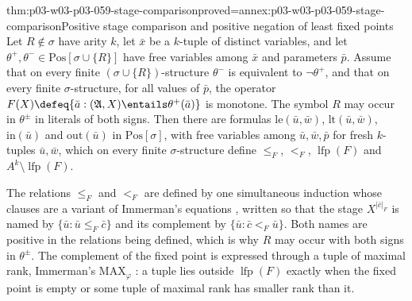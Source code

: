 \begin{hblemma}{thm:p03-w03-p03-059-stage-comparison}{proved=annex:p03-w03-p03-059-stage-comparison}{Positive stage comparison and positive negation of least fixed points}
Let \(R\notin\sigma\) have arity \(k\), let \(\bar x\) be a \(k\)-tuple of
distinct variables, and let
\(\theta^+,\theta^-\in\mathrm{Pos}[\sigma\cup\{R\}]\) have free variables
among \(\bar x\) and parameters \(\bar p\). Assume that on every finite
\((\sigma\cup\{R\})\)-structure \(\theta^-\) is equivalent to
\(\neg\theta^+\), and that on every finite \(\sigma\)-structure, for all
values of \(\bar p\), the operator
\(F(X)\defeq\{\bar a:(\mathfrak A,X)\entails\theta^+(\bar a)\}\) is
monotone. The symbol \(R\) may occur in \(\theta^\pm\) in literals of both
signs. Then there are formulas
\(\mathrm{le}(\bar u,\bar w)\), \(\mathrm{lt}(\bar u,\bar w)\),
\(\mathrm{in}(\bar u)\) and \(\mathrm{out}(\bar u)\) in
\(\mathrm{Pos}[\sigma]\), with free variables among \(\bar u,\bar w,\bar p\)
for fresh \(k\)-tuples \(\bar u,\bar w\), which on every finite
\(\sigma\)-structure define \(\le_F\), \(<_F\),
\(\operatorname{lfp}(F)\) and \(A^k\setminus\operatorname{lfp}(F)\).
\end{hblemma}

The relations \(\le_F\) and \(<_F\) are defined by one simultaneous
induction whose clauses are a variant of Immerman's equations
\cite[p.~98]{Immerman1986}, written so that the stage
\(X^{|\bar c|_F}\) is named by \(\{\bar u:\bar u\le_F\bar c\}\) and its
complement by \(\{\bar u:\bar c<_F\bar u\}\). Both names are positive in
the relations being defined, which is why \(R\) may occur with both signs
in \(\theta^\pm\). The complement of the fixed point is expressed through a
tuple of maximal rank, Immerman's \(\mathrm{MAX}_\varphi\)
\cite[Lemmas~4.5--4.6, pp.~98--99]{Immerman1986}: a tuple lies outside
\(\operatorname{lfp}(F)\) exactly when the fixed point is empty or some
tuple of maximal rank has smaller rank than it.

